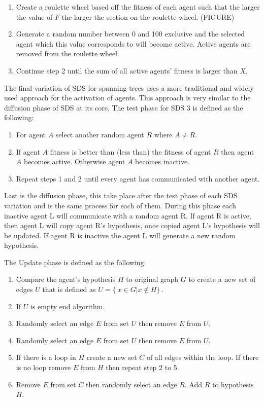 \documentclass{AISB2008}
\begin{document}
{\begin{enumerate}
\item Create a roulette wheel based off the fitness of each agent such that the larger the value of {$F$} the larger the section on the roulette wheel. (FIGURE)
\item Generate a random number between 0 and 100 exclusive and the selected agent which this value corresponds to will become active. Active agents are removed from the roulette wheel.
\item Continue step 2 until the sum of all active agents’ fitness is larger than {$X$}.
\end{enumerate}

The final variation of SDS for spanning trees uses a more traditional and widely used approach for the activation of agents. This approach is very similar to the diffusion phase of SDS at its core.
The test phase for SDS 3 is defined as the following:

\begin{enumerate}
\item For agent {$A$} select another random agent {$R$} where {$A \ne R$}.
\item If agent {$A$} fitness is better than (less than) the fitness of agent {$R$} then agent {$A$} becomes active. Otherwise agent  {$A$} becomes inactive.
\item Repeat steps 1 and 2 until every agent has communicated with another agent.
\end{enumerate}

Last is the diffusion phase, this take place after the test phase of each SDS variation and is the same process for each of them. During this phase each inactive agent L will communicate with a random agent R. If agent R is active, then agent L will copy agent R’s hypothesis, once copied agent L’s hypothesis will be updated. If agent R is inactive the agent L will generate a new random hypothesis. 

The Update phase is defined as the following:

\begin{enumerate}
\item Compare the agent’s hypothesis {$H$} to original graph {$G$} to create a new set of edges {$U$} that is defined as {$U = \{\ x \in G | x \notin H \}\ $}.
\item If {$U$} is empty end algorithm.
\item Randomly select an edge {$E$} from set {$U$} then remove {$E$} from {$U$}. 
\item Randomly select an edge {$E$} from set {$U$} then remove {$E$} from {$U$}. 
\item If there is a loop in {$H$} create a new set {$C$} of all edges within the loop. If there is no loop remove {$E$} from {$H$} then repeat step 2 to 5.
\item Remove {$E$} from set {$C$} then randomly select an edge {$R$}. Add {$R$} to hypothesis {$H$}.
\end{enumerate}

}
\end{document}
